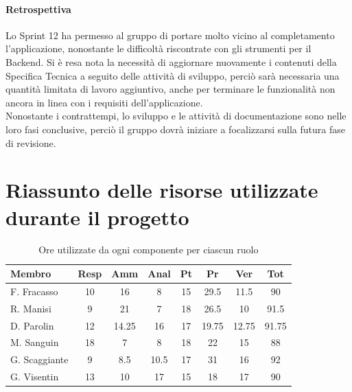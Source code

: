 \documentclass[a4paper,12pt]{article}
\begin{document}
\paragraph{Retrospettiva} Lo Sprint 12 ha permesso al gruppo di portare molto vicino al completamento l'applicazione, nonostante le difficoltà riscontrate con gli strumenti per il Backend. Si è resa nota la necessità di aggiornare nuovamente i contenuti della Specifica Tecnica a seguito delle attività di sviluppo, perciò sarà necessaria una quantità limitata di lavoro aggiuntivo, anche per terminare le funzionalità non ancora in linea con i requisiti dell'applicazione. \\
Nonostante i contrattempi, lo sviluppo e le attività di documentazione sono nelle loro fasi conclusive, perciò il gruppo dovrà iniziare a focalizzarsi sulla futura fase di revisione.


\section{Riassunto delle risorse utilizzate durante il progetto}\label{sec:consuntivo_fine_progetto}
\begin{table}[H]
    \centering
    \renewcommand{\arraystretch}{1.3}
    \small 
    \begin{tabularx}{\textwidth}{|l|C|C|C|C|C|C|C|}
        \hline
        \textbf{Membro} & \textbf{Resp} & \textbf{Amm} & \textbf{Anal} & \textbf{Pt} & \textbf{Pr} & \textbf{Ver} & \textbf{Tot}\\
        \hline
        F. Fracasso & 10 & 16 & 8 & 15 & 29.5 & 11.5 & 90 \\
        \hline
        R. Manisi & 9 & 21 & 7 & 18 & 26.5 & 10 & 91.5 \\
        \hline
        D. Parolin & 12 & 14.25 & 16 & 17 & 19.75 & 12.75 & 91.75\\
        \hline
        M. Sanguin & 18 & 7 & 8 & 18 & 22 & 15 & 88 \\
        \hline
        G. Scaggiante & 9 & 8.5 & 10.5 & 17 & 31 & 16 & 92 \\
        \hline
        G. Visentin & 13 & 10 & 17 & 15 & 18 & 17 & 90 \\
        \hline
    \end{tabularx}
    \caption{Ore utilizzate da ogni componente per ciascun ruolo}
    \label{tab:consuntivo_progetto}
\end{table}
\end{document}
